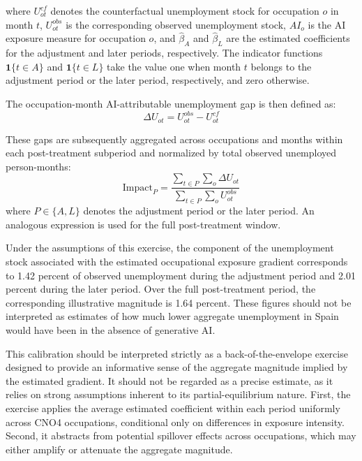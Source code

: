 \documentclass[11pt]{article}
\begin{document}
where $U^{cf}_{ot}$ denotes the counterfactual unemployment stock for occupation $o$ in month $t$, $U^{obs}_{ot}$ is the corresponding observed unemployment stock, $AI_o$ is the AI exposure measure for occupation $o$, and $\hat{\beta}_{A}$ and $\hat{\beta}_{L}$ are the estimated coefficients for the adjustment and later periods, respectively. The indicator functions $\mathbf{1}\{t \in A\}$ and $\mathbf{1}\{t \in L\}$ take the value one when month $t$ belongs to the adjustment period or the later period, respectively, and zero otherwise.

The occupation-month AI-attributable unemployment gap is then defined as:
\begin{equation}
\Delta U_{ot} = U^{obs}_{ot} - U^{cf}_{ot}
\end{equation}

These gaps are subsequently aggregated across occupations and months within each post-treatment subperiod and normalized by total observed unemployed person-months:
\begin{equation}
\text{Impact}_{P}
=
\frac{\sum_{t \in P}\sum_{o}\Delta U_{ot}}
{\sum_{t \in P}\sum_{o}U^{obs}_{ot}}
\end{equation}
where $P \in \{A,L\}$ denotes the adjustment period or the later period. An analogous expression is used for the full post-treatment window.

Under the assumptions of this exercise, the component of the unemployment stock associated with the estimated occupational exposure gradient corresponds to 1.42 percent of observed unemployment during the adjustment period and 2.01 percent during the later period. Over the full post-treatment period, the corresponding illustrative magnitude is 1.64 percent. These figures should not be interpreted as estimates of how much lower aggregate unemployment in Spain would have been in the absence of generative AI.

This calibration should be interpreted strictly as a back-of-the-envelope exercise designed to provide an informative sense of the aggregate magnitude implied by the estimated gradient. It should not be regarded as a precise estimate, as it relies on strong assumptions inherent to its partial-equilibrium nature. First, the exercise applies the average estimated coefficient within each period uniformly across CNO4 occupations, conditional only on differences in exposure intensity. Second, it abstracts from potential spillover effects across occupations, which may either amplify or attenuate the aggregate magnitude.
\end{document}
